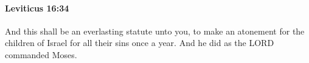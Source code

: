 
		\paragraph{Leviticus 16:34} %
			\label{LEVITICUS-16-34}

			And this shall be an everlasting statute unto you, to make an atonement for the children of Israel for all their sins once a year. And he did as the LORD commanded Moses.

